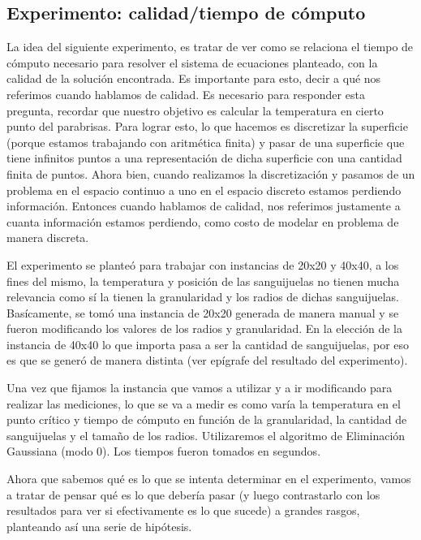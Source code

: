 \subsection{Experimento: calidad/tiempo de cómputo}
La idea del siguiente experimento, es tratar de ver como se relaciona el tiempo de cómputo necesario para resolver el sistema de ecuaciones planteado, con la calidad de la solución encontrada. Es importante para esto, decir a qué nos referimos cuando hablamos de calidad. Es necesario para responder esta pregunta, recordar que nuestro objetivo es calcular la temperatura en cierto punto del parabrisas. Para lograr esto, lo que hacemos es discretizar la superficie (porque estamos trabajando con aritmética finita) y pasar de una superficie que tiene infinitos puntos a una representación de dicha superficie con una cantidad finita de puntos. Ahora bien, cuando realizamos la discretización y pasamos de un problema en el espacio continuo a uno en el espacio discreto estamos perdiendo información. Entonces cuando hablamos de calidad, nos referimos justamente a cuanta información estamos perdiendo, como costo de modelar en problema de manera discreta.
\par El experimento se planteó para trabajar con instancias de 20x20 y 40x40, a los fines del mismo, la temperatura y posición de las sanguijuelas no tienen mucha relevancia como sí la tienen la granularidad y los radios de dichas sanguijuelas. Basícamente, se tomó una instancia de 20x20 generada de manera manual y se fueron modificando los valores de los radios y granularidad. En la elección de la instancia de 40x40 lo que importa pasa a ser la cantidad de sanguijuelas, por eso es que se generó de manera distinta (ver epígrafe del resultado del experimento).
\par Una vez que fijamos la instancia que vamos a utilizar y a ir modificando para realizar las mediciones, lo que se va a medir es como varía la temperatura en el punto crítico y tiempo de cómputo en función de la granularidad, la cantidad de sanguijuelas y el tamaño de los radios. Utilizaremos el algoritmo de Eliminación Gaussiana (modo 0). Los tiempos fueron tomados en segundos.
\newline \par Ahora que sabemos qué es lo que se intenta determinar en el experimento, vamos a tratar de pensar qué es lo que debería pasar (y luego contrastarlo con los resultados para ver si efectivamente es lo que sucede) a grandes rasgos, planteando así una serie de hipótesis. 
